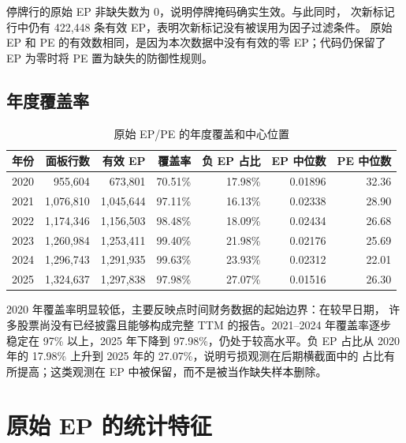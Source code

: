\documentclass[UTF8,a4paper,11pt]{ctexart}
\begin{document}
停牌行的原始 EP 非缺失数为 0，说明停牌掩码确实生效。与此同时，
次新标记行中仍有 422,448 条有效 EP，表明次新标记没有被误用为因子过滤条件。
原始 EP 和 PE 的有效数相同，是因为本次数据中没有有效的零 EP；代码仍保留了
EP 为零时将 PE 置为缺失的防御性规则。

\subsection{年度覆盖率}

\begin{table}[H]
\centering
\caption{原始 EP/PE 的年度覆盖和中心位置}
\small
\begin{tabular}{rrrrrrr}
\toprule
年份 & 面板行数 & 有效 EP & 覆盖率 & 负 EP 占比 & EP 中位数 & PE 中位数 \\
\midrule
2020 & 955,604 & 673,801 & 70.51\% & 17.98\% & 0.01896 & 32.36 \\
2021 & 1,076,810 & 1,045,644 & 97.11\% & 16.13\% & 0.02338 & 28.90 \\
2022 & 1,174,346 & 1,156,503 & 98.48\% & 18.09\% & 0.02434 & 26.68 \\
2023 & 1,260,984 & 1,253,411 & 99.40\% & 21.98\% & 0.02176 & 25.69 \\
2024 & 1,296,743 & 1,291,935 & 99.63\% & 23.93\% & 0.02312 & 22.01 \\
2025 & 1,324,637 & 1,297,838 & 97.98\% & 27.07\% & 0.01516 & 26.30 \\
\bottomrule
\end{tabular}
\end{table}

2020 年覆盖率明显较低，主要反映点时间财务数据的起始边界：在较早日期，
许多股票尚没有已经披露且能够构成完整 TTM 的报告。2021--2024 年覆盖率逐步
稳定在 97\% 以上，2025 年下降到 97.98\%，仍处于较高水平。负 EP 占比从
2020 年的 17.98\% 上升到 2025 年的 27.07\%，说明亏损观测在后期横截面中的
占比有所提高；这类观测在 EP 中被保留，而不是被当作缺失样本删除。

\section{原始 EP 的统计特征}
\end{document}
